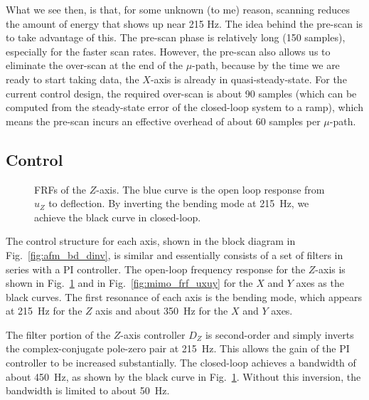 \documentclass[twocolumn,oneside]{IEEEtran/IEEEtran}
\begin{document}
What we see then, is that, for some unknown (to me) reason, scanning reduces the
amount of energy that shows up near 215 Hz. The idea behind the pre-scan is to
take advantage of this. The pre-scan phase is relatively long (150 samples),
especially for the faster scan rates. However, the pre-scan also allows us to
eliminate the over-scan at the end of the $\mu$-path, because by the time we are
ready to start taking data, the $X$-axis is already in quasi-steady-state. For
the current control design, the required over-scan is about 90 samples (which
can be computed from the steady-state error of the closed-loop system to a
ramp), which means the pre-scan incurs an effective overhead of about 60 samples
per $\mu$-path.


\subsection{Control}\label{sec:control}
\begin{figure}
  \centering
  
  \caption{FRFs of the $Z$-axis. The blue curve is the open loop response from $u_Z$ to deflection. By inverting the bending mode at 215~Hz, we achieve the black curve in closed-loop.}
  \label{fig:z_control}
\end{figure}
The control structure for each axis, shown in the block diagram in Fig.~\ref{fig:afm_bd_dinv}, is similar and essentially consists of a set of filters in series with a PI controller. The open-loop frequency response for the $Z$-axis is shown in Fig.~\ref{fig:z_control} and in Fig.~\ref{fig:mimo_frf_uxuy} for the $X$ and $Y$ axes as the black curves. The first resonance of each axis is the bending mode, which appears at 215~Hz for the $Z$ axis and about 350~Hz for the $X$ and $Y$ axes.

The filter portion of the $Z$-axis controller $D_Z$ is second-order and simply inverts the complex-conjugate pole-zero pair at 215~Hz. This allows the gain of the PI controller to be increased substantially. The closed-loop achieves a bandwidth of about 450~Hz, as shown by the black curve in Fig.~\ref{fig:z_control}. Without this inversion, the bandwidth is limited to about 50~Hz.
\end{document}
